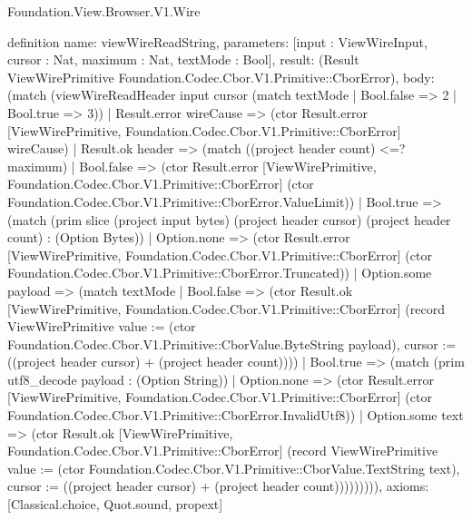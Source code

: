 \begin{lexlean}{Foundation.View.Browser.V1.Wire}
\begin{semanticmodule}
definition{
  name: viewWireReadString,
  parameters: [input : ViewWireInput, cursor : Nat, maximum : Nat, textMode : Bool],
  result: (Result ViewWirePrimitive Foundation.Codec.Cbor.V1.Primitive::CborError),
  body: (match (viewWireReadHeader input cursor (match textMode | Bool.false => 2 | Bool.true => 3))
    | Result.error wireCause => (ctor Result.error [ViewWirePrimitive, Foundation.Codec.Cbor.V1.Primitive::CborError] wireCause)
    | Result.ok header => (match ((project header count) <=? maximum)
      | Bool.false => (ctor Result.error [ViewWirePrimitive, Foundation.Codec.Cbor.V1.Primitive::CborError] (ctor Foundation.Codec.Cbor.V1.Primitive::CborError.ValueLimit))
      | Bool.true => (match (prim slice (project input bytes) (project header cursor) (project header count) : (Option Bytes))
        | Option.none => (ctor Result.error [ViewWirePrimitive, Foundation.Codec.Cbor.V1.Primitive::CborError] (ctor Foundation.Codec.Cbor.V1.Primitive::CborError.Truncated))
        | Option.some payload => (match textMode
          | Bool.false => (ctor Result.ok [ViewWirePrimitive, Foundation.Codec.Cbor.V1.Primitive::CborError] (record ViewWirePrimitive {value := (ctor Foundation.Codec.Cbor.V1.Primitive::CborValue.ByteString payload), cursor := ((project header cursor) + (project header count))}))
          | Bool.true => (match (prim utf8_decode payload : (Option String))
            | Option.none => (ctor Result.error [ViewWirePrimitive, Foundation.Codec.Cbor.V1.Primitive::CborError] (ctor Foundation.Codec.Cbor.V1.Primitive::CborError.InvalidUtf8))
            | Option.some text => (ctor Result.ok [ViewWirePrimitive, Foundation.Codec.Cbor.V1.Primitive::CborError] (record ViewWirePrimitive {value := (ctor Foundation.Codec.Cbor.V1.Primitive::CborValue.TextString text), cursor := ((project header cursor) + (project header count))}))))))),
  axioms: [Classical.choice, Quot.sound, propext]
}


\end{semanticmodule}
\end{lexlean}
